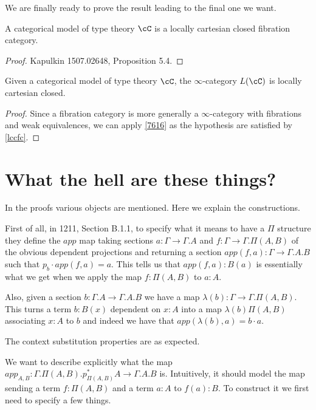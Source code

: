 \documentclass[a4paper,12pt]{scrartcl}
\begin{document}
We are finally ready to prove the result leading to the final one we want.

\begin{prop}\label{lccfc}
  A categorical model of type theory $\cC$ is a locally cartesian closed
  fibration category.
\end{prop}
\begin{proof}
  Kapulkin 1507.02648, Proposition 5.4.
\end{proof}

\begin{thm}
  Given a categorical model of type theory $\cC$, the $\infty$-category $L(\cC)$
  is locally cartesian closed.
\end{thm}
\begin{proof}
  Since a fibration category is more generally a $\infty$-category with
  fibrations and weak equivalences, we can apply \ref{7616} as the hypothesis
  are satisfied by \ref{lccfc}.
\end{proof}

\section{What the hell are these things?}

In the proofs various objects are mentioned. Here we explain the constructions.

First of all, in 1211, Section B.1.1, to specify what it means to have a $\Pi$
structure they define the $app$ map taking sections
$a\colon\Gamma\rightarrow\Gamma.A$ and $f\colon\Gamma\rightarrow\Gamma.\Pi(A,B)$
of the obvious dependent projections and returning a section
$app(f,a)\colon\Gamma\rightarrow\Gamma.A.B$ such that $p_b\cdot app(f,a)=a$.
This tells us that $app(f,a):B(a)$ is essentially what we get when we apply the
map $f:\Pi(A,B)$ to $a:A$.

Also, given a section $b\colon\Gamma.A\rightarrow\Gamma.A.B$ we have a map
$\lambda(b)\colon\Gamma\rightarrow\Gamma.\Pi(A,B)$. This turns a term $b:B(x)$
dependent on $x:A$ into a map $\lambda(b)\Pi(A,B)$ associating $x:A$ to $b$ and
indeed we have that $app(\lambda(b),a)=b\cdot a$.

The context substitution properties are as expected.

We want to describe explicitly what the map
$app_{A,B}\colon\Gamma.\Pi(A,B).p^*_{\Pi(A,B)}A\rightarrow\Gamma.A.B$ is.
Intuitively, it should model the map sending a term $f:\Pi(A,B)$ and a term
$a:A$ to $f(a):B$. To construct it we first need to specify a few things.
\end{document}
